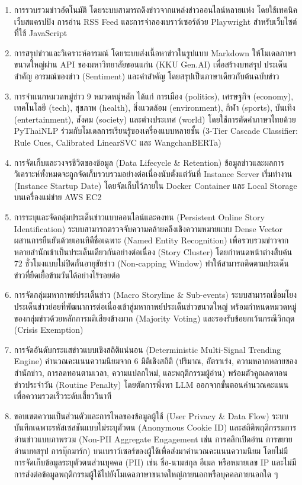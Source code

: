\begin{enumerate}[label=\arabic*)]
    \item การรวบรวมข่าวอัตโนมัติ โดยระบบสามารถดึงข่าวจากแหล่งข่าวออนไลน์หลายแห่ง โดยใช้เทคนิคเว็บสแครปปิง การอ่าน RSS Feed และการจำลองเบราว์เซอร์ด้วย Playwright สำหรับเว็บไซต์ที่ใช้ JavaScript
    \item การสรุปข่าวและวิเคราะห์อารมณ์ โดยระบบส่งเนื้อหาข่าวในรูปแบบ Markdown ให้โมเดลภาษาขนาดใหญ่ผ่าน API ของมหาวิทยาลัยขอนแก่น (KKU Gen.AI) เพื่อสร้างบทสรุป ประเด็นสำคัญ อารมณ์ของข่าว (Sentiment) และคำสำคัญ โดยสรุปเป็นภาษาเดียวกับต้นฉบับข่าว
    \item การจำแนกหมวดหมู่ข่าว 9 หมวดหมู่หลัก ได้แก่ การเมือง (politics), เศรษฐกิจ (economy), เทคโนโลยี (tech), สุขภาพ (health), สิ่งแวดล้อม (environment), กีฬา (sports), บันเทิง (entertainment), สังคม (society) และต่างประเทศ (world) โดยใช้การตัดคำภาษาไทยด้วย PyThaiNLP ร่วมกับโมเดลการเรียนรู้ของเครื่องแบบหลายชั้น (3-Tier Cascade Classifier: Rule Cues, Calibrated LinearSVC และ WangchanBERTa)
    \item การจัดเก็บและวงจรชีวิตของข้อมูล (Data Lifecycle \& Retention) ข้อมูลข่าวและผลการวิเคราะห์ทั้งหมดจะถูกจัดเก็บรวบรวมอย่างต่อเนื่องนับตั้งแต่วันที่ Instance Server เริ่มทำงาน (Instance Startup Date) โดยจัดเก็บไว้ภายใน Docker Container และ Local Storage บนเครื่องแม่ข่าย AWS EC2
    \item การระบุและจัดกลุ่มประเด็นข่าวแบบออนไลน์และคงทน (Persistent Online Story Identification) ระบบสามารถตรวจจับความคล้ายคลึงเชิงความหมายแบบ Dense Vector ผสานการยืนยันด้วยเอนทิตีชื่อเฉพาะ (Named Entity Recognition) เพื่อรวบรวมข่าวจากหลายสำนักเข้าเป็นประเด็นเดียวกันอย่างต่อเนื่อง (Story Cluster) โดยกำหนดหน้าต่างสืบค้น 72 ชั่วโมงแบบไม่ปิดกั้นอายุขัยข่าว (Non-capping Window) ทำให้สามารถติดตามประเด็นข่าวที่ยืดเยื้อข้ามวันได้อย่างไร้รอยต่อ
    \item การจัดกลุ่มมหากาพย์ประเด็นข่าว (Macro Storyline \& Sub-events) ระบบสามารถเชื่อมโยงประเด็นข่าวย่อยที่พัฒนาการต่อเนื่องเข้าสู่มหากาพย์ประเด็นข่าวขนาดใหญ่ พร้อมกำหนดหมวดหมู่ของกลุ่มข่าวด้วยหลักการมติเสียงข้างมาก (Majority Voting) และรองรับข้อยกเว้นกรณีวิกฤต (Crisis Exemption)
    \item การจัดอันดับกระแสข่าวแบบเชิงสถิติแน่นอน (Deterministic Multi-Signal Trending Engine) คำนวณคะแนนความนิยมจาก 6 มิติเชิงสถิติ (ปริมาณ, อัตราเร่ง, ความหลากหลายของสำนักข่าว, การลดทอนตามเวลา, ความแปลกใหม่, และพฤติกรรมผู้อ่าน) พร้อมตัวคูณลดทอนข่าวประจำวัน (Routine Penalty) โดยตัดการพึ่งพา LLM ออกจากขั้นตอนคำนวณคะแนนเพื่อความรวดเร็วระดับเสี้ยววินาที
    \item ขอบเขตความเป็นส่วนตัวและการไหลของข้อมูลผู้ใช้ (User Privacy \& Data Flow) ระบบบันทึกเฉพาะรหัสเซสชันแบบไม่ระบุตัวตน (Anonymous Cookie ID) และสถิติพฤติกรรมการอ่านข่าวแบบภาพรวม (Non-PII Aggregate Engagement เช่น การคลิกเปิดอ่าน การขยายอ่านบทสรุป การบุ๊กมาร์ก) บนเบราว์เซอร์ของผู้ใช้เพื่อส่งมาคำนวณคะแนนความนิยม โดยไม่มีการจัดเก็บข้อมูลระบุตัวตนส่วนบุคคล (PII) เช่น ชื่อ-นามสกุล อีเมล หรือหมายเลข IP และไม่มีการส่งต่อข้อมูลพฤติกรรมผู้ใช้ไปยังโมเดลภาษาขนาดใหญ่ภายนอกหรือบุคคลภายนอกใด ๆ

\end{enumerate}

